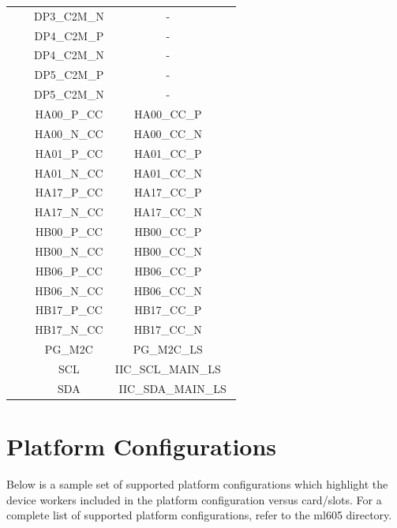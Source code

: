\documentclass{article}
\begin{document}
\begin{longtable}[l]{|c|c|c|c|}
  & & DP3\_C2M\_N & - \
  \\\cline{3-4}
  & & DP4\_C2M\_P & - \
  \\\cline{3-4}
  & & DP4\_C2M\_N & - \
  \\\cline{3-4}
  & & DP5\_C2M\_P & - \
  \\\cline{3-4}
  & & DP5\_C2M\_N & - \
  \\\cline{3-4}
  & & HA00\_P\_CC & HA00\_CC\_P \
  \\\cline{3-4}
  & & HA00\_N\_CC & HA00\_CC\_N \
  \\\cline{3-4}
  & & HA01\_P\_CC & HA01\_CC\_P \
  \\\cline{3-4}
  & & HA01\_N\_CC & HA01\_CC\_N \
  \\\cline{3-4}
  & & HA17\_P\_CC & HA17\_CC\_P \
  \\\cline{3-4}
  & & HA17\_N\_CC & HA17\_CC\_N \
  \\\cline{3-4}
  & & HB00\_P\_CC & HB00\_CC\_P \
  \\\cline{3-4}
  & & HB00\_N\_CC & HB00\_CC\_N \
  \\\cline{3-4}
  & & HB06\_P\_CC & HB06\_CC\_P \
  \\\cline{3-4}
  & & HB06\_N\_CC & HB06\_CC\_N \
  \\\cline{3-4}
  & & HB17\_P\_CC & HB17\_CC\_P \
  \\\cline{3-4}
  & & HB17\_N\_CC & HB17\_CC\_N \
  \\\cline{3-4}
  & & PG\_M2C & PG\_M2C\_LS \
  \\\cline{3-4}
	& & SCL & IIC\_SCL\_MAIN\_LS \
	\\\cline{3-4}
	& & SDA & IIC\_SDA\_MAIN\_LS \\
	\hline
\end{longtable}

\newpage
\section*{Platform Configurations}
Below is a sample set of supported platform configurations which  highlight the device workers included in the platform configuration versus card/slots. For a complete list of supported platform configurations, refer to the ml605 directory. \\
\end{document}
